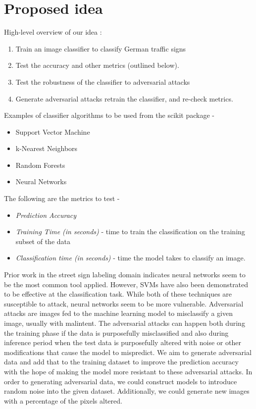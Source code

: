 \documentclass{article} %
\begin{document}
\section{Proposed idea}
High-level overview of our idea :
\begin{enumerate}
    \item Train an image classifier to classify German traffic signs
    \item Test the accuracy and other metrics (outlined below).
    \item Test the robustness of the classifier to adversarial attacks
    \item Generate adversarial attacks retrain the classifier, and re-check metrics.
\end{enumerate}

Examples of classifier algorithms to be used from the scikit package -
\begin{itemize}
    \item Support Vector Machine
    \item k-Nearest Neighbors
    \item Random Forests
    \item Neural Networks
\end{itemize}

The following are the metrics to test -
\begin{itemize}
    \item \emph{Prediction Accuracy}
    \item \emph{Training Time (in seconds)} - time to train the classification on the training subset of the data
    \item \emph{Classification time (in seconds)} - time the model takes to classify an image.
\end{itemize}

Prior work in the street sign labeling domain indicates neural networks seem to be the most common tool applied. However, SVMs have also been demonstrated to be effective at the classification task. While both of these techniques are susceptible to attack, neural networks seem to be more vulnerable.
Adversarial attacks are images fed to the machine learning model to misclassify a given image,  usually with malintent. The adversarial attacks can happen both during the training phase if the data is purposefully misclassified and also during inference period when the test data is purposefully altered with noise or other modifications that cause the model to mispredict. 
We aim to generate adversarial data and add that to the training dataset to improve the prediction accuracy with the hope of making the model more resistant to these adversarial attacks. 
In order to generating adversarial data, we could construct models to introduce random noise into the given dataset. Additionally, we could generate new images with a percentage of the pixels altered.
\end{document}
